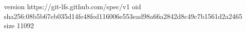 version https://git-lfs.github.com/spec/v1
oid sha256:08b5b67eb035d14fe48fed116006e553ead98a66a2842d8c49c7b1561d2a2465
size 11092
